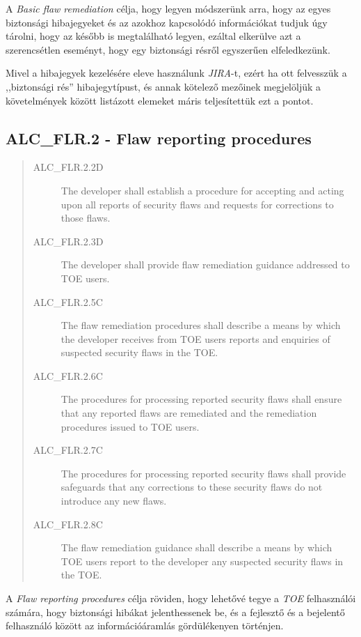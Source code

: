 A \emph{Basic flaw remediation} célja, hogy legyen módszerünk arra, hogy az egyes biztonsági
hibajegyeket és az azokhoz kapcsolódó információkat tudjuk úgy tárolni, hogy az később is
megtalálható legyen, ezáltal elkerülve azt a szerencsétlen eseményt, hogy egy biztonsági résről
egyszerűen elfeledkezünk.

Mivel a hibajegyek kezelésére eleve használunk \emph{JIRA}-t, ezért ha ott felvesszük a ,,biztonsági
rés'' hibajegytípust, és annak kötelező mezőinek megjelöljük a követelmények között listázott
elemeket máris teljesítettük ezt a pontot.

\subsection{ALC\_FLR.2 - Flaw reporting procedures}
\begin{quote}
    \begin{description}
        \item[ALC\_FLR.2.2D]{The developer shall establish a procedure for accepting and acting upon
            all reports of security flaws and requests for corrections to those flaws.}
        \item[ALC\_FLR.2.3D]{The developer shall provide flaw remediation guidance addressed to TOE
            users.}
        \item[ALC\_FLR.2.5C]{The flaw remediation procedures shall describe a means by which the
            developer receives from TOE users reports and enquiries of suspected security flaws in
        the TOE.}
        \item[ALC\_FLR.2.6C]{The procedures for processing reported security flaws shall ensure that
            any reported flaws are remediated and the remediation procedures issued to TOE users.}
        \item[ALC\_FLR.2.7C]{The procedures for processing reported security flaws shall provide
            safeguards that any corrections to these security flaws do not introduce any new flaws.}
        \item[ALC\_FLR.2.8C]{The flaw remediation guidance shall describe a means by which TOE users
            report to the developer any suspected security flaws in the TOE.}
    \end{description}
\end{quote}

A \emph{Flaw reporting procedures} célja röviden, hogy lehetővé tegye a \emph{TOE} felhasználói
számára, hogy biztonsági hibákat jelenthessenek be, és a fejlesztő és a bejelentő felhasználó
között az információáramlás gördülékenyen történjen.


